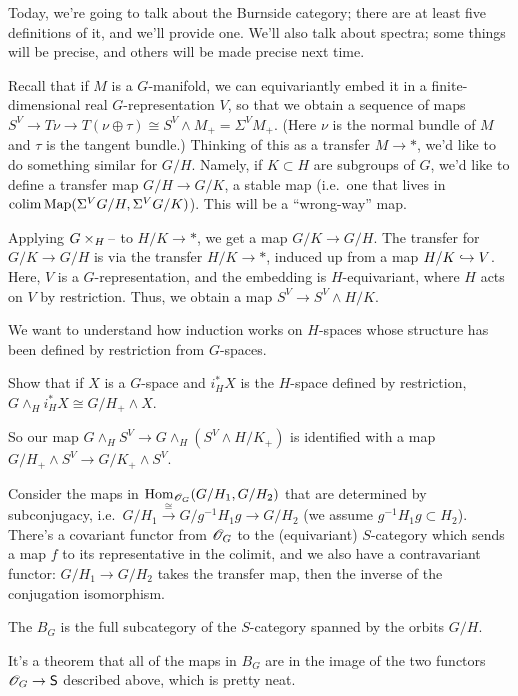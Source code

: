 Today, we're going to talk about the Burnside category; there are at least five definitions of it, and we'll
provide one. We'll also talk about spectra; some things will be precise, and others will be made precise next time.

Recall that if $M$ is a $G$-manifold, we can equivariantly embed it in a finite-dimensional real $G$-representation
$V$, so that we obtain a sequence of maps $S^V\to T\!\nu\to T(\nu\oplus\tau)\cong S^V\wedge M_+ = \Sigma^V M_+$.
(Here $\nu$ is the normal bundle of $M$ and $\tau$ is the tangent bundle.) Thinking of this as a transfer $M\to *$,
we'd like to do something similar for $G/H$. Namely, if $K\subset H$ are subgroups of $G$, we'd like to define a
transfer map $G/H\to G/K$, a stable map (i.e.\ one that lives in $\operatorname*{colim}\operatorname{Map}(\Sigma^V G/H, \Sigma^V G/K)$). This
will be a ``wrong-way'' map.

Applying $G\times_H\text{--}$ to $H/K\to *$, we get a map $G/K\to G/H$. The transfer for $G/K\to G/H$ is via the transfer
$H/K\to *$, induced up from a map $H/K\hookrightarrow V$. Here, $V$ is a $G$-representation, and the embedding is
$H$-equivariant, where $H$ acts on $V$ by restriction. Thus, we obtain a map $S^V\to S^V\wedge H/K$.

We want to understand how induction works on $H$-spaces whose structure has been defined by restriction from
$G$-spaces.
\begin{ex}
Show that if $X$ is a $G$-space and $i_H^*X$ is the $H$-space defined by restriction, $G\wedge_H i_H^*X\cong
G/H_+\wedge X$.
\end{ex}
So our map $G\wedge_H S^V\to G\wedge_H(S^V\wedge H/K_+)$ is identified with a map $G/H_+\wedge S^V\to G/K_+\wedge
S^V$.

Consider the maps in $\operatorname{Hom}_{\mathscr O_G}(G/H_1, G/H_2)$ that are determined by subconjugacy, i.e.\
$G/H_1\stackrel\cong\to G/g^{-1}H_1g\to G/H_2$ (we assume $g^{-1}H_1g\subset H_2$). There's a covariant functor
from $\mathscr O_G$ to the (equivariant) $S$-category which sends a map $f$ to its representative in the colimit, and we
also have a contravariant functor: $G/H_1\to G/H_2$ takes the transfer map, then the inverse of the conjugation
isomorphism.
\begin{defn}
The  $B_G$ is the full subcategory of the $S$-category spanned by the orbits $G/H$.
\end{defn}
It's a theorem that all of the maps in $B_G$ are in the image of the two functors $\mathscr O_G\to\mathsf S$ described above,
which is pretty neat.

